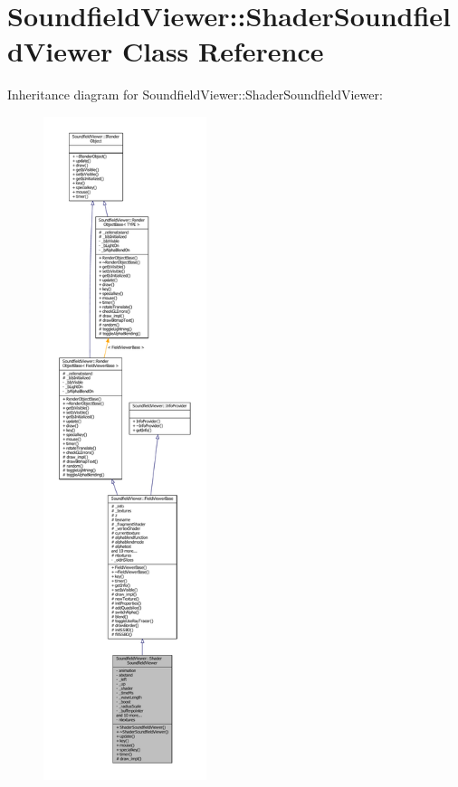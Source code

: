 \section{Soundfield\-Viewer\-:\-:Shader\-Soundfield\-Viewer Class Reference}
\label{classSoundfieldViewer_1_1ShaderSoundfieldViewer}


Inheritance diagram for Soundfield\-Viewer\-:\-:Shader\-Soundfield\-Viewer\-:
\nopagebreak
\begin{figure}[H]
\begin{center}
\leavevmode
\includegraphics[height=550pt]{db/d61/classSoundfieldViewer_1_1ShaderSoundfieldViewer__inherit__graph}
\end{center}
\end{figure}


